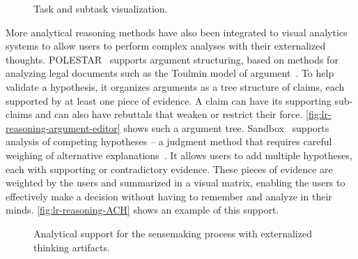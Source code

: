 \begin{figure}[!htb]
\centering
{}
\hfill
{}
\caption{Task and subtask visualization.}
\end{figure}

More analytical reasoning methods have also been integrated to visual analytics systems to allow users to perform complex analyses with their externalized thoughts. POLESTAR~\cite{Pioch2006} supports argument structuring, based on methods for analyzing legal documents such as the Toulmin model of argument~\cite{Toulmin2003}. To help validate a hypothesis, it organizes arguments as a tree structure of claims, each supported by at least one piece of evidence. A claim can have its supporting sub-claims and can also have rebuttals that weaken or restrict their force. \autoref{fig:lr-reasoning-argument-editor} shows such a argument tree. Sandbox~\cite{Wright2006} supports analysis of competing hypotheses -- a judgment method that requires careful weighing of alternative explanations~\cite{Heuer1999}. It allows users to add multiple hypotheses, each with supporting or contradictory evidence. These pieces of evidence are weighted by the users and summarized in a visual matrix, enabling the users to effectively make a decision without having to remember and analyze in their minds. \autoref{fig:lr-reasoning-ACH} shows an example of this support.

\begin{figure}[!htb]
\centering
{}
\hfill
{}
\caption[Analytical support for the sensemaking process]{Analytical support for the sensemaking process with externalized thinking artifacts.}
\label{fig:lr-reasoning}
\end{figure}

